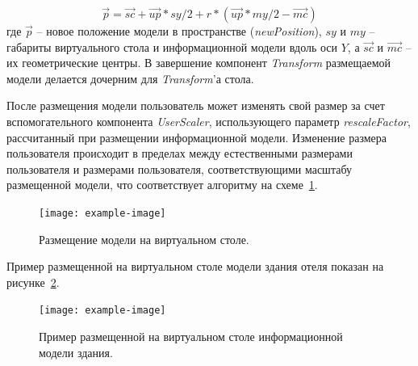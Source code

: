 \[
    \vec{p} = \vec{sc} +
    \vec{up} * sy / 2 +
    r * (
        \vec{up} * my / 2 - \vec{mc}
    )
\]
где $\vec{p}$ -- новое положение модели в пространстве (\emph{newPosition}),
$sy$ и $my$ -- габариты виртуального стола и информационной модели
вдоль оси $Y$, а $\vec{sc}$ и $\vec{mc}$ -- их геометрические центры.
В завершение компонент \emph{Transform} размещаемой модели
делается дочерним для \emph{Transform}'а стола.

После размещения модели пользователь может изменять свой размер
за счет вспомогательного компонента \emph{UserScaler},
использующего параметр \emph{rescaleFactor}, рассчитанный
при размещении информационной модели. Изменение размера пользователя
происходит в пределах между естественными размерами пользователя
и размерами пользователя, соответствующими масштабу размещенной модели,
что соответствует алгоритму на схеме~\ref{figure:SSetUserSize}.

\begin{figure}[!htp]
    \centering
    \texttt{[image: example-image]}
    \caption{Размещение модели на виртуальном столе.}
    \label{figure:SSetUserSize}
\end{figure}

Пример размещенной на виртуальном столе модели здания отеля
показан на рисунке~\ref{figure:PlacedModelExample}.

\begin{figure}[!htp]
    \centering
    \texttt{[image: example-image]}
    \caption{Пример размещенной на виртуальном столе
    информационной модели здания.}
    \label{figure:PlacedModelExample}
\end{figure}
